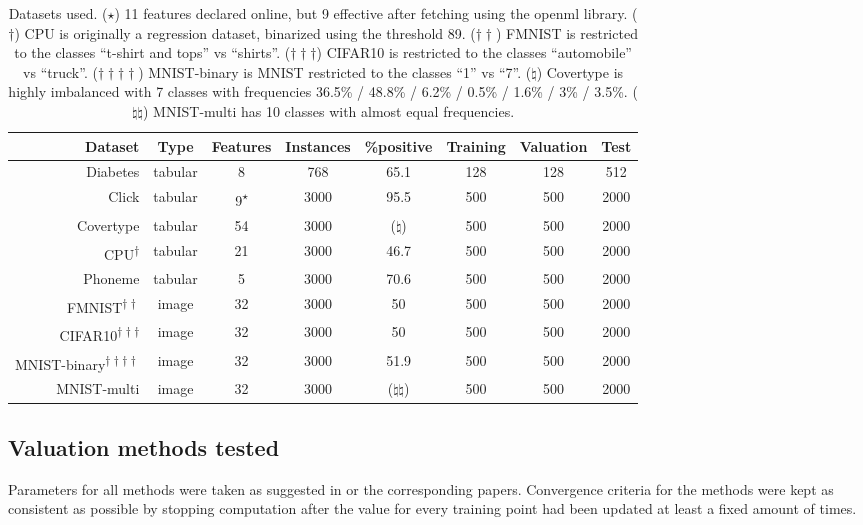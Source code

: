 \documentclass[10pt]{article}
\newcommand{\tmrsup}[1]{\textsuperscript{#1}}
\begin{document}
\begin{table}[h]
  \begin{tabular}{rccccccc}
    Dataset & Type & Features & Instances & \%positive & Training & Valuation
    & Test\\
    \hline
    Diabetes & tabular & 8 & 768 & 65.1 & 128 & 128 & 512\\
    Click & tabular & 9\tmrsup{$\star$} & 3000 & 95.5 & 500 & 500 & 2000\\
    Covertype & tabular & 54 & 3000 & ($\natural$) & 500 & 500 & 2000\\
    CPU\tmrsup{$\dagger$} & tabular & 21 & 3000 & 46.7 & 500 & 500 & 2000\\
    Phoneme & tabular & 5 & 3000 & 70.6 & 500 & 500 & 2000\\
    FMNIST\tmrsup{$\dagger \dagger$} & image & 32 & 3000 & 50 & 500 & 500 &
    2000\\
    CIFAR10\tmrsup{$\dagger \dagger \dagger$} & image & 32 & 3000 & 50 & 500 &
    500 & 2000\\
    MNIST-binary\tmrsup{$\dagger \dagger \dagger \dagger$} & image & 32 & 3000
    & 51.9 & 500 & 500 & 2000\\
    MNIST-multi & image & 32 & 3000 & ($\natural \natural$) & 500 & 500 & 2000
  \end{tabular}
  \caption{Datasets used. ($\star$) 11 features declared online, but 9
  effective after fetching using the openml library. ($\dagger$) CPU is
  originally a regression dataset, binarized using the threshold 89. ($\dagger
  \dagger$) FMNIST is restricted to the classes ``t-shirt and tops'' vs
  ``shirts''. ($\dagger \dagger \dagger$) CIFAR10 is restricted to the classes
  ``automobile'' vs ``truck''. ($\dagger \dagger \dagger \dagger$)
  MNIST-binary is MNIST restricted to the classes ``1'' vs ``7''. ($\natural$)
  Covertype is highly imbalanced with 7 classes with frequencies 36.5\% /
  48.8\% / 6.2\% / 0.5\% / 1.6\% / 3\% / 3.5\%. ($\natural \natural$)
  MNIST-multi has 10 classes with almost equal frequencies.}
\end{table}

\subsection{Valuation methods tested}

Parameters for all methods were taken as suggested in
{\cite{schoch_csshapley_2022}} or the corresponding papers. Convergence
criteria for the methods were kept as consistent as possible by stopping
computation after the value for every training point had been updated at least
a fixed amount of times.
\end{document}
